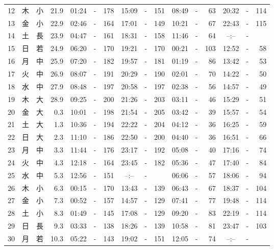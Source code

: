 \documentclass[12pt.a4j]{jsarticle}
\begin{document}
\begin{center}
\begin{table}[ht]
\begin{tabular}{|rc|cr|ccrccr|ccrccr|}
12 & 木 & 小 & 21.9 &  01:24 &-& 178  &  15:09 &-& 151  &   08:49 &-&  63  &   20:32 &-& 114  \\
13 & 金 & 小 & 22.9 &  02:46 &-& 164  &  17:01 &-& 149  &   10:21 &-&  67  &   22:43 &-& 115  \\
14 & 土 & 長 & 23.9 &  04:47 &-& 161  &  18:31 &-& 158  &   11:46 &-&  64  &   --:-- &-&     \\
15 & 日 & 若 & 24.9 &  06:20 &-& 170  &  19:21 &-& 170  &   00:21 &-& 103  &   12:52 &-&  58  \\
16 & 月 & 中 & 25.9 &  07:20 &-& 182  &  19:57 &-& 181  &   01:19 &-&  86  &   13:42 &-&  53  \\
17 & 火 & 中 & 26.9 &  08:07 &-& 191  &  20:29 &-& 190  &   02:01 &-&  70  &   14:22 &-&  50  \\
18 & 水 & 中 & 27.9 &  08:48 &-& 197  &  20:58 &-& 197  &   02:38 &-&  56  &   14:57 &-&  49  \\
19 & 木 & 大 & 28.9 &  09:25 &-& 200  &  21:26 &-& 203  &   03:11 &-&  46  &   15:29 &-&  51  \\
20 & 金 & 大 &  0.3 &  10:01 &-& 198  &  21:54 &-& 205  &   03:42 &-&  39  &   15:57 &-&  54  \\
21 & 土 & 大 &  1.3 &  10:36 &-& 194  &  22:22 &-& 204  &   04:12 &-&  36  &   16:25 &-&  59  \\
22 & 日 & 大 &  2.3 &  11:10 &-& 186  &  22:50 &-& 200  &   04:40 &-&  36  &   16:51 &-&  66  \\
23 & 月 & 中 &  3.3 &  11:44 &-& 176  &  23:17 &-& 192  &   05:08 &-&  40  &   17:16 &-&  74  \\
24 & 火 & 中 &  4.3 &  12:18 &-& 164  &  23:45 &-& 182  &   05:36 &-&  47  &   17:40 &-&  84  \\
25 & 水 & 中 &  5.3 &  12:56 &-& 151  &  --:-- &-&     &   06:06 &-&  57  &   18:06 &-&  94  \\
26 & 木 & 小 &  6.3 &  00:15 &-& 170  &  13:43 &-& 139  &   06:43 &-&  67  &   18:37 &-& 104  \\
27 & 金 & 小 &  7.3 &  00:52 &-& 157  &  14:57 &-& 129  &   07:41 &-&  77  &   19:48 &-& 114  \\
28 & 土 & 小 &  8.3 &  01:49 &-& 145  &  17:08 &-& 129  &   09:20 &-&  83  &   22:19 &-& 114  \\
29 & 日 & 長 &  9.3 &  03:33 &-& 138  &  18:26 &-& 139  &   10:58 &-&  81  &   23:47 &-& 103  \\
30 & 月 & 若 & 10.3 &  05:22 &-& 143  &  19:02 &-& 151  &   12:05 &-&  74  &   --:-- &-&     \\

\end{tabular}
\end{table}
\end{center}
\end{document}
